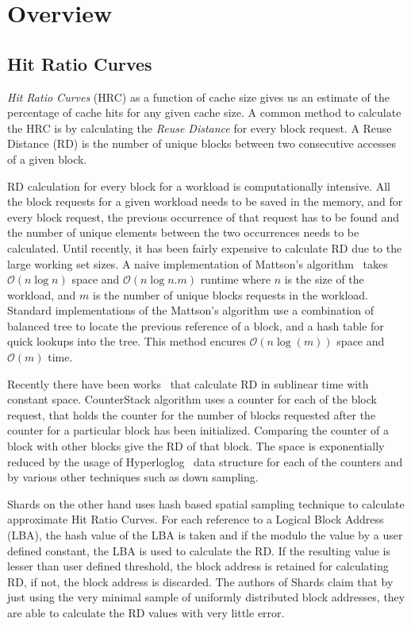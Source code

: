 \section{Overview}

\subsection{Hit Ratio Curves}
\emph{Hit Ratio Curves} (HRC) as a function of cache size gives us an estimate of the percentage of cache hits for any given cache size. A common method to calculate the HRC is by calculating the \emph{Reuse Distance} for every block request. A Reuse Distance (RD) is the number of unique blocks between two consecutive accesses of a given block.

RD calculation for every block for a workload is computationally intensive. All the block requests for a given workload needs to be saved in the memory, and for every block request, the previous occurrence of that request has to be found and the number of unique elements between the two occurrences needs to be calculated. Until recently, it has been fairly expensive to calculate RD due to the large working set sizes. A naive implementation of Mattson's algorithm~\cite{mattson_evaluation_1970} takes $\mathcal{O}(n\log{n})$ space and $\mathcal{O}(n\log{n.m})$ runtime where $n$ is the size of the workload, and $m$ is the number of unique blocks requests in the workload. Standard implementations of the Mattson's algorithm use a combination of balanced tree to locate the previous reference of a block, and a hash table for quick lookups into the tree. This method encures $\mathcal{O}(n\log(m))$ space and $\mathcal{O}(m)$ time.

Recently there have been works~\cite{niu_parda:_2012, waldspurger_efficient_2015, wires_characterizing_2014} that calculate RD in sublinear time with constant space. CounterStack algorithm uses a counter for each of the block request, that holds the counter for the number of blocks requested after the counter for a particular block has been initialized. Comparing the counter of a block with other blocks give the RD of that block. The space is exponentially reduced by the usage of Hyperloglog~\cite{flajolet_hyperloglog:_2007} data structure for each of the counters and by various other techniques such as down sampling.

Shards on the other hand uses hash based spatial sampling technique to calculate approximate Hit Ratio Curves. For each reference to a Logical Block Address (LBA), the hash value of the LBA is taken and if the modulo the value by a user defined constant, the LBA is used to calculate the RD. If the resulting value is lesser than user defined threshold, the block address is retained for calculating RD, if not, the block address is discarded. The authors of Shards claim that by just using the very minimal sample of uniformly distributed block addresses, they are able to calculate the RD values with very little error.

